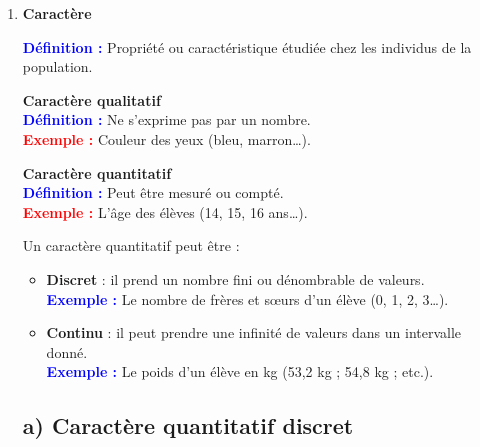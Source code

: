 \documentclass[a4paper,12pt]{article}
\begin{document}
\begin{enumerate}[leftmargin=1.5cm, label=\textbf{\arabic*)}]
    \item \textbf{Caractère} \\
    \begin{tcolorbox}[colback=red!5!white, colframe=red!60!black, boxrule=0.5pt]
        \textcolor{blue}{\textbf{Définition :}} Propriété ou caractéristique étudiée chez les individus de la population.
    \end{tcolorbox}
    
    \begin{multicols}{2}
        \begin{tcolorbox}[colback=red!5!white, colframe=red!60!black, boxrule=0.5pt]
            \textbf{Caractère qualitatif} \\
            \textcolor{blue}{\textbf{Définition :}} Ne s’exprime pas par un nombre. \\
            \textcolor{red}{\textbf{Exemple :}} Couleur des yeux (bleu, marron…).
        \end{tcolorbox}
        
        \begin{tcolorbox}[colback=red!5!white, colframe=red!60!black, boxrule=0.5pt]
            \textbf{Caractère quantitatif} \\
            \textcolor{blue}{\textbf{Définition :}} Peut être mesuré ou compté. \\
            \textcolor{red}{\textbf{Exemple :}} L’âge des élèves (14, 15, 16 ans…).
        \end{tcolorbox}
    \end{multicols}

\begin{tcolorbox}[colback=red!5!white, colframe=red!60!black, boxrule=0.5pt]
Un caractère quantitatif peut être :
\begin{itemize}
    \item \textbf{Discret} : il prend un nombre fini ou dénombrable de valeurs.\\
    \textcolor{blue}{\textbf{Exemple :}} Le nombre de frères et sœurs d’un élève (0, 1, 2, 3…).

    \item \textbf{Continu} : il peut prendre une infinité de valeurs dans un intervalle donné.\\
    \textcolor{blue}{\textbf{Exemple :}} Le poids d’un élève en kg (53,2 kg ; 54,8 kg ; etc.).
\end{itemize}
\end{tcolorbox}


\subsection*{\textbf{a) Caractère quantitatif discret}}


\end{enumerate}
\end{document}
